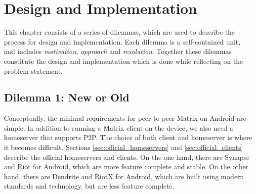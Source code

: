 \chapter{Design and Implementation}
This chapter consists of a series of dilemmas, which are used to describe the process for design and implementation.
Each dilemma is a self-contained unit, and includes \textit{motivation}, \textit{approach} and \textit{resolution}.
Together these dilemmas constitute the design and implementation which is done while reflecting on the problem statement.

\section{Dilemma 1: New or Old}
Conceptually, the minimal requirements for peer-to-peer Matrix on Android are simple.
In addition to running a Matrix client on the device, we also need a homeserver that supports \ac{P2P}.
The choice of both client and homeserver is where it becomes difficult.
Sections \ref{sec:official_homeservers} and \ref{sec:official_clients} describe the official homeservers and clients.
On the one hand, there are Synapse and Riot for Android, which are more feature complete and stable.
On the other hand, there are Dendrite and RiotX for Android, which are built using modern standards and technology, but are less feature complete.

